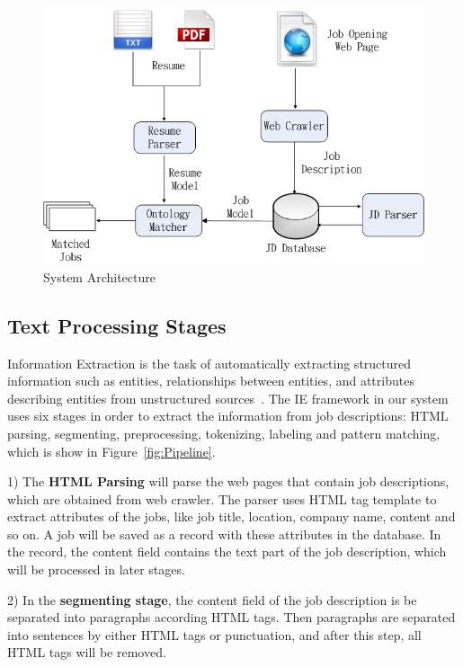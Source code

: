 \begin{figure}[htbp]
  \centering
  \includegraphics[scale=0.5]{images/arch.png}
  \caption{System Architecture}
  \label{fig:arch}
\end{figure}

\subsection{Text Processing Stages}

Information Extraction is the task of automatically extracting structured information such as entities, relationships between entities, and attributes describing entities from unstructured sources~\cite{sarawagi2008information}. The IE framework in our system uses six stages in order to extract the information from job descriptions: HTML parsing, segmenting, preprocessing, tokenizing, labeling and pattern matching, which is show in Figure~\ref{fig:Pipeline}.

1) The \textbf{HTML Parsing} will parse the web pages that contain job descriptions, which are obtained from web crawler. The parser uses HTML tag template to extract attributes of the jobs, like job title, location, company name, content and so on. A job will be saved as a record with these attributes in the database. In the record, the content field contains the text part of the job description, which will be processed in later stages.

2) In the \textbf{segmenting stage}, the content field of the job description is be separated into paragraphs according HTML tags. Then paragraphs are separated into sentences by either HTML tags or punctuation, and after this step, all HTML tags will be removed.

